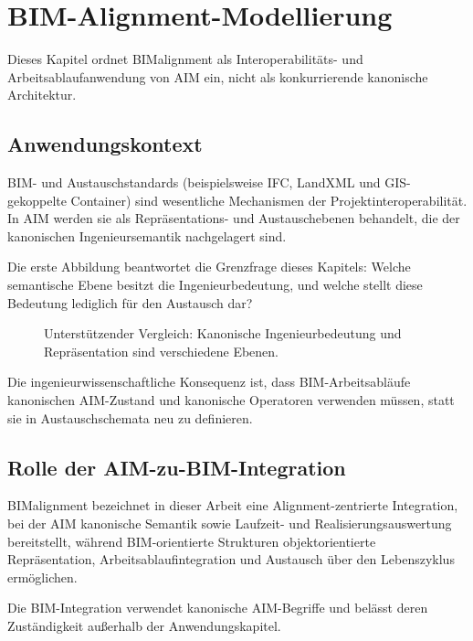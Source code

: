\chapter{BIM-Alignment-Modellierung}
\label{chap:applications-bimalignment}

Dieses Kapitel ordnet BIMalignment als Interoperabilitäts- und
Arbeitsablaufanwendung von AIM ein, nicht als konkurrierende kanonische
Architektur.

\section{Anwendungskontext}

BIM- und Austauschstandards (beispielsweise IFC, LandXML und GIS-gekoppelte
Container) sind wesentliche Mechanismen der Projektinteroperabilität. In
AIM werden sie als Repräsentations- und Austauschebenen behandelt, die der
kanonischen Ingenieursemantik nachgelagert sind.

Die erste Abbildung beantwortet die Grenzfrage dieses Kapitels: Welche
semantische Ebene besitzt die Ingenieurbedeutung, und welche stellt diese
Bedeutung lediglich für den Austausch dar?

\begin{figure}[ht]
\centering

\caption{Unterstützender Vergleich: Kanonische Ingenieurbedeutung und Repräsentation sind verschiedene Ebenen.}
\label{fig:support-canonical-vs-representation}
\end{figure}

Die ingenieurwissenschaftliche Konsequenz ist, dass BIM-Arbeitsabläufe
kanonischen AIM-Zustand und kanonische Operatoren verwenden müssen, statt
sie in Austauschschemata neu zu definieren.

\section{Rolle der AIM-zu-BIM-Integration}

BIMalignment bezeichnet in dieser Arbeit eine Alignment-zentrierte
Integration, bei der AIM kanonische Semantik sowie Laufzeit- und
Realisierungsauswertung bereitstellt, während BIM-orientierte Strukturen
objektorientierte Repräsentation, Arbeitsablaufintegration und Austausch
über den Lebenszyklus ermöglichen.

\begin{principle}
Die BIM-Integration verwendet kanonische AIM-Begriffe und belässt deren
Zuständigkeit außerhalb der Anwendungskapitel.
\end{principle}

